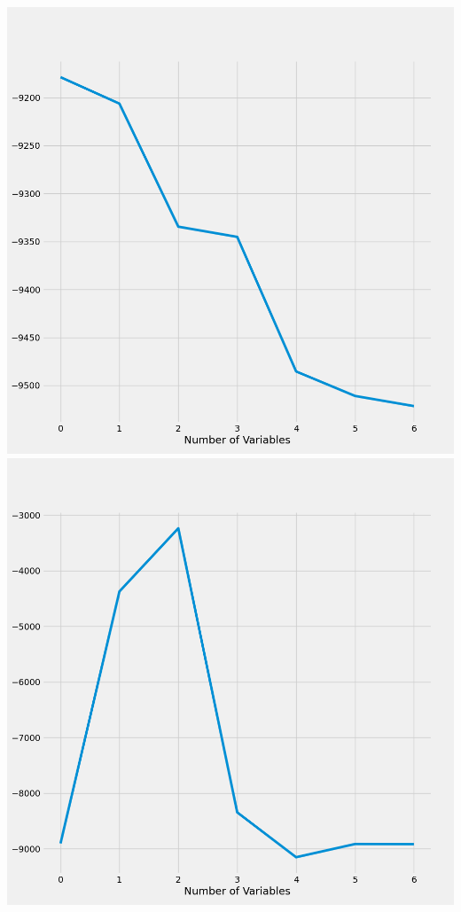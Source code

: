 \documentclass{article}
\begin{document}
	\includegraphics[scale = 0.2]{../plots/python/AICConcreteForward4L.png} 
	\includegraphics[scale = 0.2]{../plots/python/AICConcreteBackward4L.png}
\end{document}
